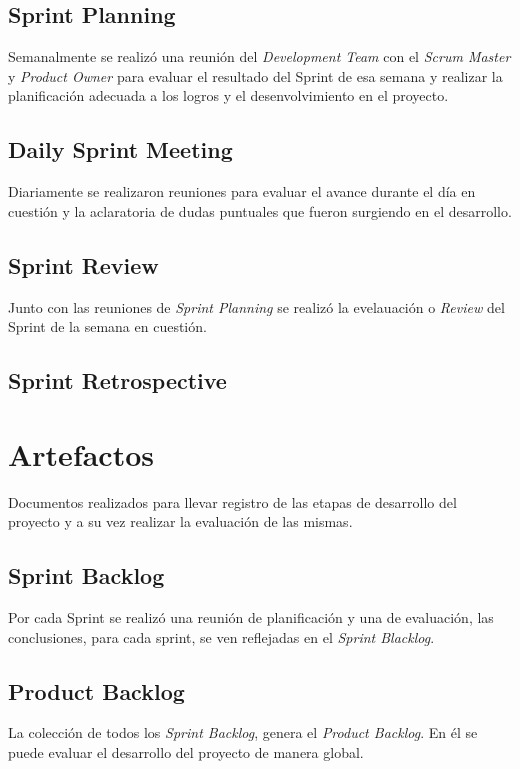         \subsection{Sprint Planning}
        
        Semanalmente se realizó una reunión del \textit{Development Team} con el \textit{Scrum Master} y \textit{Product Owner} para evaluar el resultado del Sprint de esa semana y realizar la planificación adecuada a los logros y el desenvolvimiento en el proyecto.
        
        \subsection{Daily Sprint Meeting}
        
        Diariamente se realizaron reuniones para evaluar el avance durante el día en cuestión y la aclaratoria de dudas puntuales que fueron surgiendo en el desarrollo.
        
        \subsection{Sprint Review}
        
        Junto con las reuniones de \textit{Sprint Planning} se realizó la evelauación o \textit{Review} del Sprint de la semana en cuestión.
        
        \subsection{Sprint Retrospective}
        
    \section{Artefactos}
    
    Documentos realizados para llevar registro de las etapas de desarrollo del proyecto y a su vez realizar la evaluación de las mismas.
    
        \subsection{Sprint Backlog}
        
        Por cada Sprint se realizó una reunión de planificación y una de evaluación, las conclusiones, para cada sprint, se ven reflejadas en el \textit{Sprint Blacklog}.
            
        \subsection{Product Backlog}
        
        La colección de todos los \textit{Sprint Backlog}, genera el \textit{Product Backlog}. En él se puede evaluar el desarrollo del proyecto de manera global.
        
    
\pagebreak